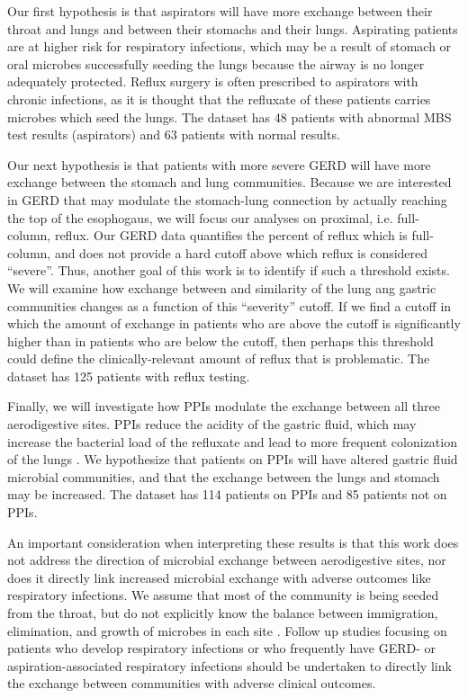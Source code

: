 \documentclass[12pt]{article}
\begin{document}
Our first hypothesis is that aspirators will have more exchange between their throat and lungs and between their stomachs and their lungs.
Aspirating patients are at higher risk for respiratory infections, which
may be a result of stomach or oral microbes successfully seeding the lungs
because the airway is no longer adequately protected.
Reflux surgery is often prescribed to aspirators with chronic infections,
as it is thought that the refluxate of these patients carries microbes which seed the lungs. 
The dataset has 48 patients with abnormal MBS test results (aspirators) and 63 patients with normal results.

Our next hypothesis is that patients with more severe GERD will have 
more exchange between the stomach and lung communities. Because we are 
interested in GERD that may modulate the stomach-lung connection by
actually reaching the top of the esophogaus, we will focus our analyses
on proximal, i.e. full-column, reflux. Our GERD data quantifies the
percent of reflux which is full-column, and does not provide a hard
cutoff above which reflux is considered ``severe''. Thus, another goal
of this work is to identify if such a threshold exists. We will examine
how exchange between and similarity of the lung ang gastric communities
changes as a function of this ``severity'' cutoff. If we find a cutoff
in which the amount of exchange in patients who are above the cutoff is 
significantly higher than in patients who are below the cutoff, then perhaps
this threshold could define the clinically-relevant amount of reflux that is
problematic. The dataset has 125 patients with reflux testing.

Finally, we will investigate how PPIs modulate the exchange between
all three aerodigestive sites. PPIs reduce the acidity of the gastric
fluid, which may increase the bacterial load of the refluxate and
lead to more frequent colonization of the lungs \cite{rosen-bal_culture-2011}.
We hypothesize that patients on PPIs will have altered gastric fluid
microbial communities, and that the exchange between the lungs and
stomach may be increased. The dataset has 114 patients on PPIs and 85 patients not on PPIs.

An important consideration when interpreting these results is that
this work does not address the direction of microbial exchange between 
aerodigestive sites, nor does it directly link increased microbial 
exchange with adverse outcomes like respiratory infections.
We assume that most of the community is being seeded from the throat, 
but do not explicitly know the balance between immigration, elimination, and 
growth of microbes in each site \cite{bassis-source-2015}.
Follow up studies focusing on patients who develop respiratory 
infections or who frequently have GERD- or aspiration-associated 
respiratory infections should be undertaken to directly link the exchange
between communities with adverse clinical outcomes. 
\end{document}
